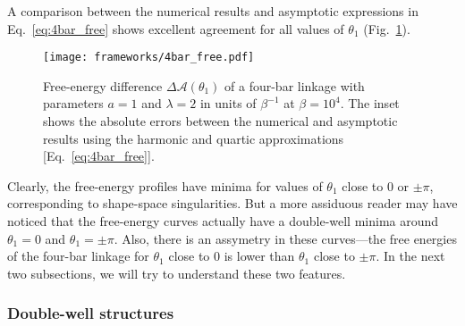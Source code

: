 A comparison between the numerical results and asymptotic expressions in Eq.~\eqref{eq:4bar_free} shows excellent agreement for all values of $\theta_{1}$ (Fig.~\ref{fig:4bar_free}).
%
\begin{figure}
  \begin{center}
    \texttt{[image: frameworks/4bar\_free.pdf]}
  \end{center}
  \caption{Free-energy difference $\Delta\mathscr{A}(\theta_1)$ of a four-bar linkage with parameters $a=1$ and $\lambda=2$ in units of $\beta^{-1}$ at $\beta = 10^{4}$.
  The inset shows the absolute errors between the numerical and asymptotic results using the harmonic and quartic approximations [Eq.~\eqref{eq:4bar_free}].}
  \label{fig:4bar_free}
\end{figure}

Clearly, the free-energy profiles have minima for values of $\theta_{1}$ close to $0$ or $\pm\pi$, corresponding to shape-space singularities.
But a more assiduous reader may have noticed that the free-energy curves actually have a double-well minima around $\theta_{1} = 0$ and $\theta_{1} = \pm\pi$.
Also, there is an assymetry in these curves---the free energies of the four-bar linkage for $\theta_{1}$ close to $0$ is lower than $\theta_{1}$ close to $\pm\pi$.
In the next two subsections, we will try to understand these two features.

\subsubsection*{Double-well structures}

